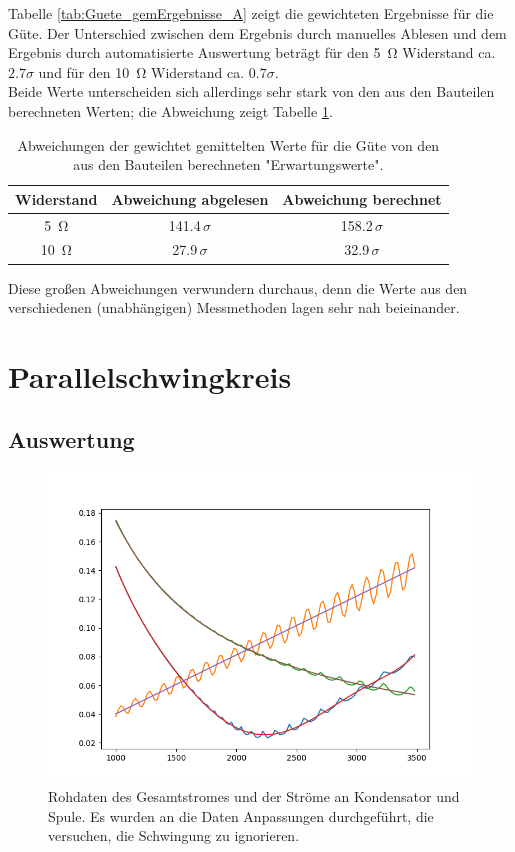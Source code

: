 \documentclass[12pt,a4paper]{article}
\begin{document}
Tabelle \ref{tab:Guete_gemErgebnisse_A} zeigt die gewichteten Ergebnisse für die Güte. Der Unterschied zwischen dem Ergebnis durch manuelles Ablesen und dem Ergebnis durch automatisierte Auswertung beträgt für den \SI{5}{\ohm} Widerstand ca. $2.7 \sigma$ und für den \SI{10}{\ohm} Widerstand ca. $0.7 \sigma$.\\
Beide Werte unterscheiden sich allerdings sehr stark von den aus den Bauteilen berechneten Werten; die Abweichung zeigt Tabelle \ref{tab:Guete_Abweichungen_A}.

\begin{table}
\begin{center}
\begin{tabular}{|c|c|c|}
\hline 
Widerstand & Abweichung abgelesen & Abweichung berechnet \\ 
\hline 
\SI{5}{\ohm} & 141.4$\, \sigma$ & 158.2$\, \sigma$ \\ 
\hline 
\SI{10}{\ohm} & 27.9$\, \sigma$ & 32.9$\, \sigma$ \\ 
\hline 
\end{tabular} 
\caption{Abweichungen der gewichtet gemittelten Werte für die Güte von den aus den Bauteilen berechneten "Erwartungswerte".}
\label{tab:Guete_Abweichungen_A}
\end{center}
\end{table}

Diese großen Abweichungen verwundern durchaus, denn die Werte aus den verschiedenen (unabhängigen) Messmethoden lagen sehr nah beieinander.


\newpage
\section{Parallelschwingkreis}

\subsection{Auswertung}
\begin{figure}
\centering
\includegraphics[scale=1]{Bilder/Parallel_Rohdaten.png}
\caption{Rohdaten des Gesamtstromes und der Ströme an Kondensator und Spule. Es wurden an die Daten Anpassungen durchgeführt, die versuchen, die Schwingung zu ignorieren.}
\label{fig:parallel_Rohdaten}
\end{figure}
\end{document}
